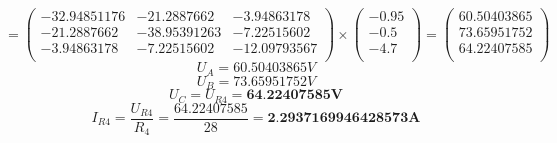 \[
  =
  \begin{pmatrix}
    -32.94851176 & -21.2887662 &  -3.94863178\\
    -21.2887662 & -38.95391263 &  -7.22515602\\
    -3.94863178 &  -7.22515602 & -12.09793567\\
  \end{pmatrix}
  \times
  \begin{pmatrix}
    -0.95\\
    -0.5\\
    -4.7\\
  \end{pmatrix}
  =
  \begin{pmatrix}
    60.50403865\\
    73.65951752\\
    64.22407585\\
  \end{pmatrix}
\]
\[
  U_A = 60.50403865V
\]
\[
  U_B = 73.65951752V
\]
\[
  U_C = U_{R4} = \textbf{64.22407585V}
\]
\[
  I_{R4} = \displaystyle\frac{U_{R4}}{R_4}
  = \displaystyle\frac{64.22407585}{28}
  = \textbf{2.2937169946428573A}
\]

